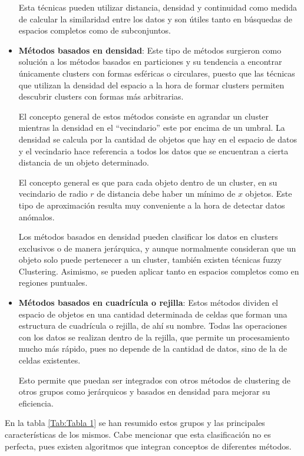 \documentclass[3p,twocolumn]{elsarticle}
\begin{document}
\begin{itemize}
  Esta técnicas pueden utilizar distancia, densidad y continuidad como medida de calcular la similaridad entre los datos y son útiles tanto en búsquedas de espacios completos como de subconjuntos.
  
  \item \textbf{Métodos basados en densidad}: Este tipo de métodos surgieron como solución a los métodos basados en particiones y su tendencia a encontrar únicamente clusters con formas esféricas o circulares, puesto que las técnicas que utilizan la densidad del espacio a la hora de formar clusters permiten descubrir clusters con formas más arbitrarias. 
  
  El concepto general de estos métodos consiste en agrandar un cluster mientras la densidad en el ``vecindario'' este por encima de un umbral. La densidad se calcula por la cantidad de objetos que hay en el espacio de datos y el vecindario hace referencia a todos los datos que se encuentran a cierta distancia de un objeto determinado.
  
  El concepto general es que para cada objeto dentro de un cluster, en su vecindario de radio $r$ de distancia debe haber un mínimo de $x$ objetos. Este tipo de aproximación resulta muy conveniente a la hora de detectar datos anómalos.
  
  Los métodos basados en densidad pueden clasificar los datos en clusters exclusivos o de manera jerárquica, y aunque normalmente consideran que un objeto solo puede pertenecer a un cluster, también existen técnicas fuzzy Clustering. Asimismo, se pueden aplicar tanto en espacios completos como en regiones puntuales.
  
  \item \textbf{Métodos basados en cuadrícula o rejilla}: Estos métodos dividen el espacio de objetos en una cantidad determinada de celdas que forman una estructura de cuadrícula o rejilla, de ahí su nombre. Todas las operaciones con los datos se realizan dentro de la rejilla, que permite un procesamiento mucho más rápido, pues no depende de la cantidad de datos, sino de la de celdas existentes.
  
  Esto permite que puedan ser integrados con otros métodos de clustering de otros grupos como jerárquicos y basados en densidad para mejorar su eficiencia.
\end{itemize}

En la tabla \ref{Tab:Tabla 1} se han resumido estos grupos y las principales características de los mismos. Cabe mencionar que esta clasificación no es perfecta, pues existen algoritmos que integran conceptos de diferentes métodos. 
\end{document}
